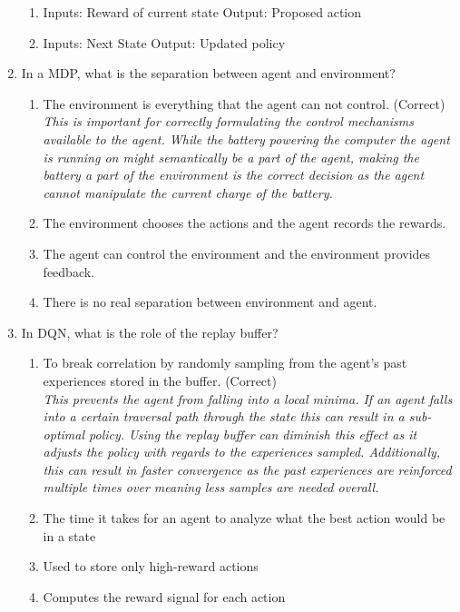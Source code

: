 \documentclass{exam}
\begin{document}
\begin{enumerate}
\begin{enumerate}
            \item Inputs: Reward of current state Output: Proposed action
            \item Inputs: Next State Output: Updated policy
        \end{enumerate}
    \item In a MDP, what is the separation between agent and environment?
        \begin{enumerate}
            \item The environment is everything that the agent can not control. (Correct)\\
                \textit{This is important for correctly formulating the control mechanisms available to the agent. While the battery powering the computer the agent is running on might semantically be a part of the agent, making the battery a part of the environment is the correct decision as the agent cannot manipulate the current charge of the battery.}
            \item The environment chooses the actions and the agent records the rewards.
            \item The agent can control the environment and the environment provides feedback.
            \item There is no real separation between environment and agent.
        \end{enumerate}
    \item In DQN, what is the role of the replay buffer?
        \begin{enumerate}
            \item To break correlation by randomly sampling from the agent's past experiences stored in the buffer. (Correct)\\
            \textit{This prevents the agent from falling into a local minima. If an agent falls into a certain traversal path through the state this can result in a sub-optimal policy. Using the replay buffer can diminish this effect as it adjusts the policy with regards to the experiences sampled. Additionally, this can result in faster convergence as the past experiences are reinforced multiple times over meaning less samples are needed overall.}
            \item The time it takes for an agent to analyze what the best action would be in a state
            \item Used to store only high-reward actions
            \item Computes the reward signal for each action
        \end{enumerate}

\end{enumerate}
\end{document}
